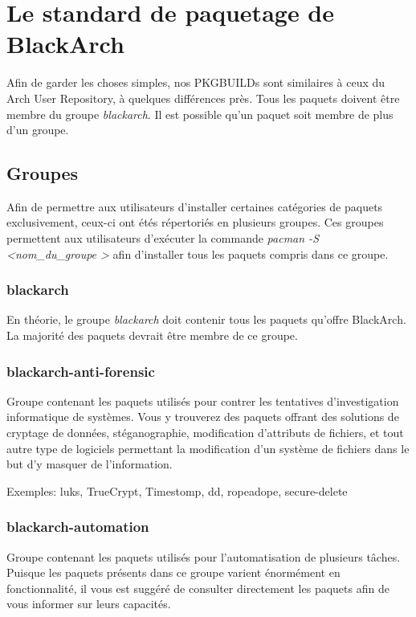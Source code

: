 \documentclass[a4paper, oneside, 11pt]{book}
\begin{document}
\section{Le standard de paquetage de BlackArch}

Afin de garder les choses simples, nos PKGBUILDs sont similaires à ceux du
Arch User Repository, à quelques différences près. Tous les paquets doivent
être membre du groupe \textit{blackarch}. Il est possible qu'un paquet soit
membre de plus d'un groupe.

\subsection{Groupes}

Afin de permettre aux utilisateurs d'installer certaines catégories de paquets
exclusivement, ceux-ci ont étés répertoriés en plusieurs groupes. Ces groupes
permettent aux utilisateurs d'exécuter la commande
\textit{pacman -S \textless nom\_du\_groupe \textgreater } afin d'installer tous
 les paquets compris dans ce groupe.

\subsubsection{blackarch}

En théorie, le groupe \textit{blackarch} doit contenir tous les paquets qu'offre
BlackArch. La majorité des paquets devrait être membre de ce groupe.

\subsubsection{blackarch-anti-forensic}

Groupe contenant les paquets utilisés pour contrer les tentatives
d'investigation informatique de systèmes. Vous y trouverez des paquets offrant
des solutions de cryptage de données, stéganographie, modification d'attributs
de fichiers, et tout autre type de logiciels permettant la modification d'un
système de fichiers dans le but d'y masquer de l'information.

Exemples: luks, TrueCrypt, Timestomp, dd, ropeadope, secure-delete

\subsubsection{blackarch-automation}

Groupe contenant les paquets utilisés pour l'automatisation de plusieurs tâches.
Puisque les paquets présents dans ce groupe varient énormément en
fonctionnalité, il vous est suggéré de consulter directement les paquets
afin de vous informer sur leurs capacités.
\end{document}
